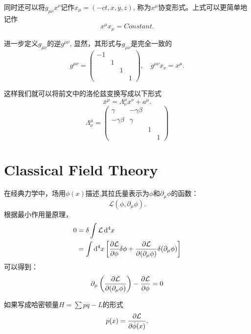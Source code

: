 同时还可以将$g_{\mu\nu} x^\nu$记作$x_\mu=(-ct, x, y, z)$, 称为$x^\mu$协变形式。上式可以更简单地记作
\begin{equation}
    x^\mu x_\mu=Constant.
\end{equation}

进一步定义$g_{\mu\nu}$的逆$g^{\mu\nu}$, 显然，其形式与$g_{\mu\nu}$是完全一致的
\begin{equation}
        g^{\mu\nu}=\begin{pmatrix}
        -1 &&&\\
        &1 &&\\
        &&1&\\
        &&&1
    \end{pmatrix}, \quad g^{\mu\nu}x_\nu= x^\mu.
\end{equation}

这样我们就可以将前文中的洛伦兹变换写成以下形式
\begin{equation}
    \bar{x}^\mu=\Lambda_\nu^\mu x^\nu + a^\mu.
\end{equation}
\begin{equation}
    \Lambda_\nu^\mu=\begin{pmatrix}
        \gamma & -\gamma\beta && \\
        -\gamma\beta & \gamma && \\
        &&1&\\
        &&&1
    \end{pmatrix}
\end{equation}


\section{Classical Field Theory}
在经典力学中，场用$\phi(x)$描述,其拉氏量表示为$\phi$和$\partial_\mu\phi$的函数：
\begin{equation}
    \mathcal{L}(\phi,\partial_\mu\phi).
\end{equation} 
根据最小作用量原理，
\begin{equation}
    \begin{aligned}
        0&=\delta\int \mathcal{L}\,\mathrm{d}^4 x\\
        &=\int\mathrm{d}^4 x\left[\frac{\partial \mathcal{L}}{\partial \phi}\delta\phi+\frac{\partial \mathcal{L}}{\partial (\partial_\mu\phi)}\delta(\partial_\mu\phi)\right]\\
    \end{aligned}
\end{equation}
可以得到：
\begin{equation}
    \partial_\mu\left(\frac{\partial \mathcal{L}}{\partial (\partial_\mu\phi)}\right)-\frac{\partial \mathcal{L}}{\partial \phi}=0
\end{equation}

如果写成哈密顿量$H=\sum p\dot{q}-L$的形式
\begin{equation}
    p(x)=\frac{\partial \mathcal{L}}{\partial \dot{\phi}(x)}.
\end{equation}